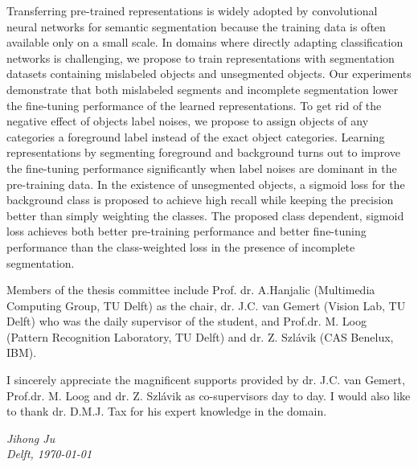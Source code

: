 

Transferring pre-trained representations is widely adopted by convolutional neural networks for semantic segmentation because the training data is often available only on a small scale.
In domains where directly adapting classification networks is challenging, we propose to train representations with segmentation datasets containing mislabeled objects and unsegmented objects.
Our experiments demonstrate that both mislabeled segments and incomplete segmentation lower the fine-tuning performance of the learned representations.
To get rid of the negative effect of objects label noises, we propose to assign objects of any categories a foreground label instead of the exact object categories.
Learning representations by segmenting foreground and background turns out to improve the fine-tuning performance significantly when label noises are dominant in the pre-training data.
In the existence of unsegmented objects, a sigmoid loss for the background class is proposed to achieve high recall while keeping the precision better than simply weighting the classes.
The proposed class dependent, sigmoid loss achieves both better pre-training performance and better fine-tuning performance than the class-weighted loss in the presence of incomplete segmentation.


Members of the thesis committee include Prof. dr. A.Hanjalic (Multimedia Computing Group, TU Delft) as the chair, dr. J.C. van Gemert (Vision Lab, TU Delft) who was the daily supervisor of the student, and Prof.dr. M. Loog  (Pattern Recognition Laboratory, TU Delft) and dr. Z. Szlávik (CAS Benelux, IBM).

I sincerely appreciate the magnificent supports provided by dr. J.C. van Gemert, Prof.dr. M. Loog and dr. Z. Szlávik as co-supervisors day to day.
I would also like to thank dr. D.M.J. Tax for his expert knowledge in the domain.

\begin{flushright}
{\makeatletter\itshape
    Jihong Ju \\
    Delft, \today
\makeatother}
\end{flushright}

